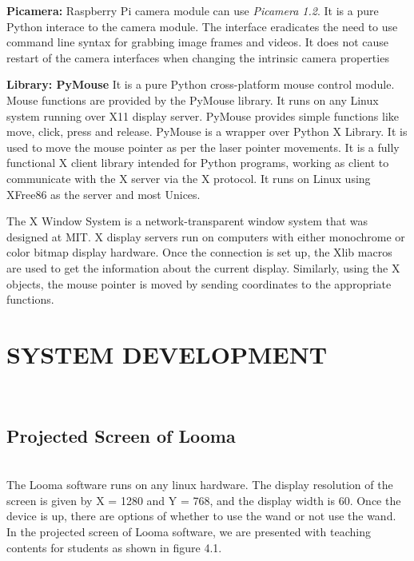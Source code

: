 \documentclass[12pt, a4paper]{article}
\begin{document}
{\textbf{Picamera:} Raspberry Pi camera module can use \emph{Picamera 1.2}. It is a pure Python interace to the camera module. The interface eradicates the need to use command line syntax for grabbing image frames and videos. It does not cause restart of the camera interfaces when changing the intrinsic camera properties

\textbf{Library: PyMouse}
It is a pure Python cross-platform mouse control module. Mouse functions are provided by the PyMouse library. It runs on any Linux system running over X11 display server. PyMouse provides simple functions like move, click, press and release. PyMouse is a wrapper over Python X Library. It is used to move the mouse pointer as per the laser pointer movements. It is a fully functional X client library intended for Python programs, working as client to communicate with the X server via the X protocol. It runs on Linux using XFree86 as the server and most Unices.

The X Window System is a network-transparent window system that was designed at MIT. X display servers run on computers with either monochrome or color bitmap display hardware. Once the connection is set up, the Xlib macros are used to get the information about the current display. Similarly, using the X objects, the mouse pointer is moved by sending coordinates to the appropriate functions. 

\newpage
\section{SYSTEM DEVELOPMENT}
~\\
\subsection{Projected Screen of Looma}
~\\
The Looma software runs on any linux hardware. The display resolution of the screen is given by X = 1280 and Y = 768, and the display width is 60. Once the device is up, there are options of whether to use the wand or not use the wand. In the projected screen of Looma software, we are presented with teaching contents for students as shown in figure 4.1.



}
\end{document}
